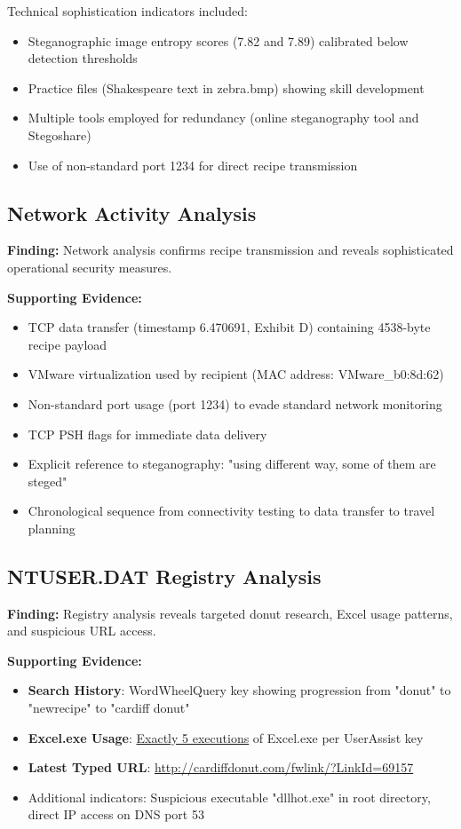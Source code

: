 Technical sophistication indicators included:
\begin{itemize}
    \item Steganographic image entropy scores (7.82 and 7.89) calibrated below detection thresholds
    \item Practice files (Shakespeare text in zebra.bmp) showing skill development
    \item Multiple tools employed for redundancy (online steganography tool and Stegoshare)
    \item Use of non-standard port 1234 for direct recipe transmission
\end{itemize}

\subsection{Network Activity Analysis}
\textbf{Finding:} Network analysis confirms recipe transmission and reveals sophisticated operational security measures.

\textbf{Supporting Evidence:}
\begin{itemize}
    \item TCP data transfer (timestamp 6.470691, Exhibit D) containing 4538-byte recipe payload
    \item VMware virtualization used by recipient (MAC address: VMware\_b0:8d:62)
    \item Non-standard port usage (port 1234) to evade standard network monitoring
    \item TCP PSH flags for immediate data delivery
    \item Explicit reference to steganography: "using different way, some of them are steged"
    \item Chronological sequence from connectivity testing to data transfer to travel planning
\end{itemize}

\subsection{NTUSER.DAT Registry Analysis}
\textbf{Finding:} Registry analysis reveals targeted donut research, Excel usage patterns, and suspicious URL access.

\textbf{Supporting Evidence:}
\begin{itemize}
    \item \textbf{Search History}: WordWheelQuery key showing progression from "donut" to "newrecipe" to "cardiff donut"
    \item \textbf{Excel.exe Usage}: \underline{Exactly 5 executions} of Excel.exe per UserAssist key
    \item \textbf{Latest Typed URL}: \url{http://cardiffdonut.com/fwlink/?LinkId=69157}
    \item Additional indicators: Suspicious executable "dllhot.exe" in root directory, direct IP access on DNS port 53
\end{itemize}

